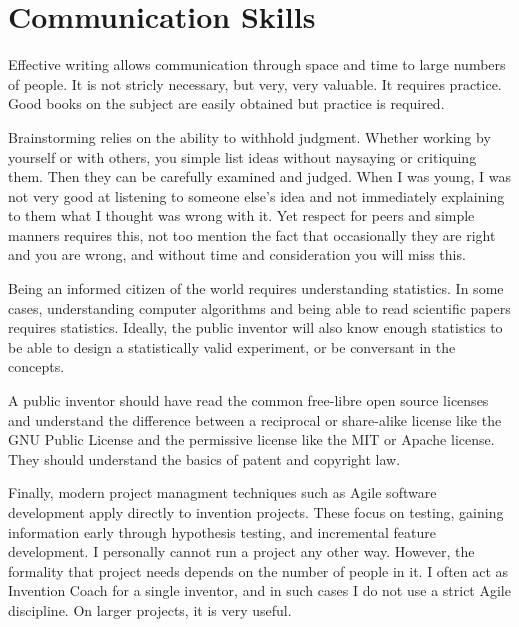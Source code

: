 \documentclass[
	fontsize=10pt, %
	twoside=false, %
	secnumdepth=1, %
]{kaobook}
\begin{document}
\section{Communication Skills}

Effective writing allows communication through space and time to
large numbers of people. It is not stricly necessary, but very, very
valuable. It requires practice.
Good books on the subject are easily obtained but practice is required.

Brainstorming relies on the ability to withhold judgment.
Whether working by yourself or with others, you simple list ideas
without naysaying or critiquing them.
Then they can be carefully examined and judged.
When I was young, I was not very good at listening to someone else's
idea and not immediately explaining to them what I thought was wrong with it.
Yet respect for peers and simple manners requires this, not too mention
the fact that occasionally they are right and you are wrong, and without
time and consideration you will miss this.

Being an informed citizen of the world requires understanding statistics.
In some cases, understanding computer algorithms and being able to read
scientific papers requires statistics. Ideally, the public inventor
will also know enough statistics to be able to design a statistically
valid experiment, or be conversant in the concepts.

A public inventor should have read the common free-libre open
source licenses and understand the difference between a reciprocal or share-alike
license like the GNU Public License and the permissive license like the MIT
or Apache license. They should understand the basics of patent and copyright law.

Finally, modern project managment techniques such as Agile software development
apply directly to invention projects. These focus on testing,
gaining information early through hypothesis testing, and incremental
feature development. I personally cannot run a project any other way.
However, the formality that project needs depends on the number of people
in it. I often act as Invention Coach for a single inventor, and in such
cases I do not use a strict Agile discipline. On larger projects, it
is very useful.
\end{document}
